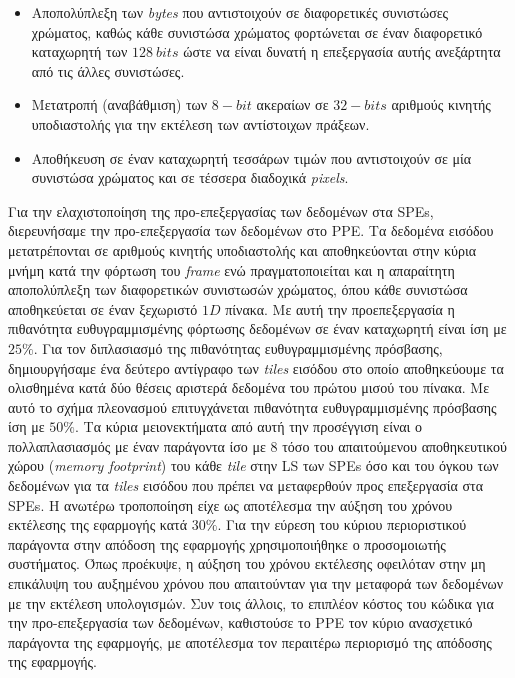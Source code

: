 \begin{itemize}

\item{Αποπολύπλεξη των \textsl{bytes} που αντιστοιχούν σε διαφορετικές συνιστώσες χρώματος, καθώς κάθε συνιστώσα χρώματος φορτώνεται σε έναν διαφορετικό καταχωρητή των \(128\ bits\) ώστε να είναι δυνατή η επεξεργασία αυτής ανεξάρτητα από τις άλλες συνιστώσες.}

\item{Μετατροπή (αναβάθμιση) των \(8-bit\) ακεραίων σε \(32-bits\) αριθμούς κινητής υποδιαστολής για την εκτέλεση των αντίστοιχων πράξεων.}

\item{Αποθήκευση σε έναν καταχωρητή τεσσάρων τιμών που αντιστοιχούν σε μία συνιστώσα χρώματος και σε τέσσερα διαδοχικά \textsl{pixels}.}

\end{itemize}
\indent
Για την ελαχιστοποίηση της προ-επεξεργασίας των δεδομένων στα \acp{SPE}, διερευνήσαμε την προ-επεξεργασία των δεδομένων στο \ac{PPE}. Τα δεδομένα εισόδου μετατρέπονται σε αριθμούς κινητής υποδιαστολής και αποθηκεύονται στην κύρια μνήμη κατά την φόρτωση του \textsl{frame} ενώ πραγματοποιείται και η απαραίτητη αποπολύπλεξη των διαφορετικών συνιστωσών χρώματος, όπου κάθε συνιστώσα αποθηκεύεται σε έναν ξεχωριστό \(1D\) πίνακα. Με αυτή την προεπεξεργασία η πιθανότητα ευθυγραμμισμένης φόρτωσης δεδομένων σε έναν καταχωρητή είναι ίση με \(25\%\). Για τον διπλασιασμό της πιθανότητας ευθυγραμμισμένης πρόσβασης, δημιουργήσαμε ένα δεύτερο αντίγραφο των \textsl{tiles} εισόδου στο οποίο αποθηκεύουμε τα ολισθημένα κατά δύο θέσεις αριστερά δεδομένα του πρώτου μισού του πίνακα. Με αυτό το σχήμα πλεονασμού επιτυγχάνεται πιθανότητα ευθυγραμμισμένης πρόσβασης ίση με \(50\%\).\newline \indent 
Τα κύρια μειονεκτήματα από αυτή την προσέγγιση είναι ο πολλαπλασιασμός με έναν παράγοντα ίσο με \(8\) τόσο του απαιτούμενου αποθηκευτικού χώρου (\textsl{memory footprint}) του κάθε \textsl{tile} στην \ac{LS} των \acp{SPE} όσο και του όγκου των δεδομένων για τα \textsl{tiles} εισόδου που πρέπει να μεταφερθούν προς επεξεργασία στα \acp{SPE}.\newline \indent
Η ανωτέρω τροποποίηση είχε ως αποτέλεσμα την αύξηση του χρόνου εκτέλεσης της εφαρμογής κατά \(30\%\). Για την εύρεση του κύριου περιοριστικού παράγοντα στην απόδοση της εφαρμογής χρησιμοποιήθηκε ο προσομοιωτής συστήματος. Όπως προέκυψε, η αύξηση του χρόνου εκτέλεσης οφειλόταν στην μη επικάλυψη του αυξημένου χρόνου που απαιτούνταν για την μεταφορά των δεδομένων με την εκτέλεση υπολογισμών. Συν τοις άλλοις, το επιπλέον κόστος του κώδικα για την προ-επεξεργασία των δεδομένων, καθιστούσε το \ac{PPE} τον κύριο ανασχετικό παράγοντα της εφαρμογής, με αποτέλεσμα τον περαιτέρω περιορισμό της απόδοσης της εφαρμογής.

